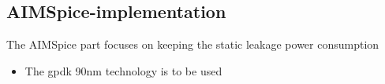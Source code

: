 \subsection{AIMSpice-implementation}
The AIMSpice part focuses on keeping the static leakage power consumption
\begin{itemize}
    \item The gpdk 90nm technology is to be used
\end{itemize} 